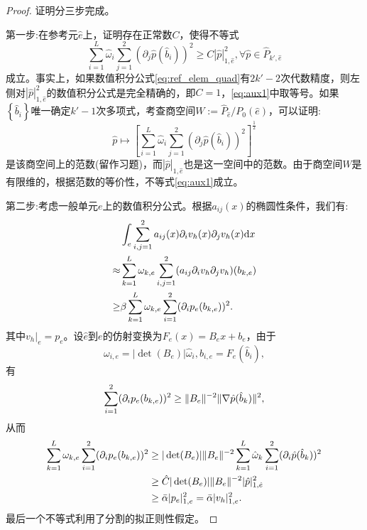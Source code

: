\begin{proof}
    证明分三步完成。

    第一步:在参考元$\hat{e}$上，证明存在正常数$C$，使得不等式
    \begin{equation}
        \label{eq:aux1}
        \sum_{i=1}^{L}\hat{\omega}_{i}\sum_{j=1}^{2}(\partial_{j}\hat{p}(\hat{b}_{i}))^{2}\ge C|\hat{p}|_{1,\hat{e}}^{2},\forall\hat{p}\in \hat{P}_{k',\hat{e}}
    \end{equation}
    成立。事实上，如果数值积分公式\eqref{eq:ref_elem_quad}有$2k'-2$次代数精度，则左侧对$|\hat{p}|_{1,\hat{e}}^{2}$的数值积分公式是完全精确的，即$C=1$，\eqref{eq:aux1}中取等号。如果$\left\{\hat{b}_{i}\right\}$唯一确定$k'-1$次多项式，考查商空间$W:=\hat{P}_{\hat{e}}/P_{0}(\hat{e})$，可以证明:
    \begin{equation}
        \hat{p}\mapsto\left[\sum_{i=1}^{L}\hat{\omega}_{i}\sum_{j=1}^{2}\left(\partial_{j}\hat{p}(\hat{b}_{i})\right)^{2}\right]^{\frac{1}{2}}
    \end{equation}
    是该商空间上的范数(留作习题)，而$|\hat{p}|_{1,\hat{e}}$也是这一空间中的范数。由于商空间$W$是有限维的，根据范数的等价性，不等式\eqref{eq:aux1}成立。

    第二步:考虑一般单元$e$上的数值积分公式。根据$a_{ij}(x)$的椭圆性条件，我们有:
    \begin{equation}
        \begin{aligned}
            \label{eq:normal_integral}
            &\int_{e}\sum_{i,j=1}^{2}a_{ij}(x)\partial_{i}v_{h}(x)\partial_{j}v_{h}(x)\mathrm{d} x\\
            \approx&\sum_{k=1}^{L}\omega_{k,e}\sum_{i,j=1}^{2}(a_{ij}\partial_{i}v_{h}\partial_{j}v_{h})(b_{k,e})\\
            \ge&\beta\sum_{k=1}^{L}\omega_{k,e}\sum_{i=1}^{2}(\partial_{i}p_{e}(b_{k,e}))^{2}.
        \end{aligned}
    \end{equation}
    其中$v_{h}|_{e}=p_{e}$。设$\hat{e}$到$e$的仿射变换为$F_{e}(x)=B_{e}x+b_{e}$，由于
    \begin{equation}
        \omega_{i,e}=|\det(B_{e})|\hat{\omega}_{i},b_{i,e}=F_{e}(\hat{b}_{i}),
    \end{equation}
    有
    \begin{equation}
        \sum_{i=1}^{2}(\partial_{i}p_{e}(b_{k,e}))^{2}\ge\|B_{e}\|^{-2}\|\nabla \hat{p}(\hat{b}_{k})\|^{2},
    \end{equation}
    从而
    \begin{equation}
        \label{eq:element_integral}
        \begin{aligned}
            \sum_{k=1}^{L}\omega_{k,e}\sum_{i=1}^{2}(\partial_{i}p_{e}(b_{k,e}))^{2}&\ge|\det(B_{e})|\|B_{e}\|^{-2}\sum_{k=1}^{L}\hat{\omega}_{k}\sum_{i=1}^{2}(\partial_{i}\hat{p}(\hat{b}_{k}))^{2}\\
            &\ge\hat{C}|\det(B_{e})|\|B_{e}\|^{-2}|\hat{p}|_{1,\hat{e}}^{2}\\
            &\ge\bar{\alpha}|p_{e}|_{1,e}^{2}=\bar{\alpha}|v_{h}|_{1,e}^{2}.
        \end{aligned}
    \end{equation}
    最后一个不等式利用了分割的拟正则性假定。


\end{proof}
